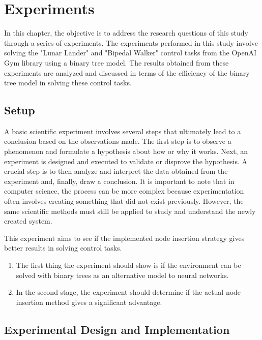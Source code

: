 \chapter{Experiments}
\label{ch:experiments}

In this chapter, the objective is to address the research questions of this study through a series of experiments. The experiments performed in this study involve solving the "Lunar Lander" and "Bipedal Walker" control tasks from the OpenAI Gym library using a binary tree model. The results obtained from these experiments are analyzed and discussed in terms of the efficiency of the binary tree model in solving these control tasks.

\section{Setup}
A basic scientific experiment involves several steps that ultimately lead to a conclusion based on the observations made. The first step is to observe a phenomenon and formulate a hypothesis about how or why it works. Next, an experiment is designed and executed to validate or disprove the hypothesis. A crucial step is to then analyze and interpret the data obtained from the experiment and, finally, draw a conclusion. It is important to note that in computer science, the process can be more complex because experimentation often involves creating something that did not exist previously. However, the same scientific methods must still be applied to study and understand the newly created system.

This experiment aims to see if the implemented node insertion strategy gives better results in solving control tasks.

\begin{enumerate}
\item The first thing the experiment should show is if the environment can be solved with binary trees as an alternative model to neural networks.
\item In the second stage, the experiment should determine if the actual node insertion method gives a significant advantage.
\end{enumerate}

\section{Experimental Design and Implementation}

